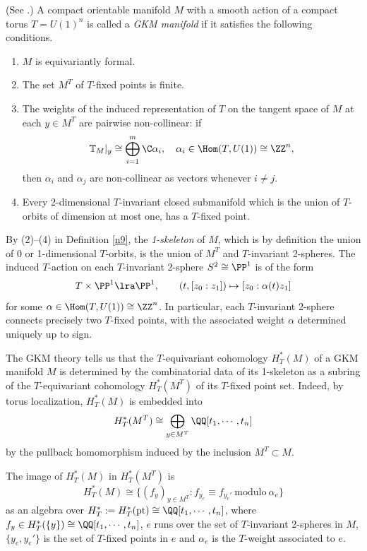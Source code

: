\begin{definition}\label{n9}
(See \cite[Definition 5.1]{AB}.)
A compact orientable manifold $M$ with a smooth action of a compact torus $T=U(1)^n$ is called a \emph{GKM manifold} if it satisfies the following conditions. 
	\begin{enumerate}
		\item $M$ is equivariantly formal.
		\item The set $M^T$ of $T$-fixed points is finite.
		\item The weights of the induced representation of $T$ on the tangent space of $M$ at each $y\in M^T$ are pairwise non-collinear: if
		\[\mathbb{T}_M|_y \cong \bigoplus_{i=1}^m \C \alpha_i, \quad \alpha_i\in \Hom (T,U(1))\cong \ZZ^n, \]
			then $\alpha_i$ and $\alpha_j$ are non-collinear as vectors %
			whenever $i\neq j$.
		\item Every 2-dimensional $T$-invariant closed submanifold which is the union of $T$-orbits of dimension at most one, has a $T$-fixed point. 
	\end{enumerate}
\end{definition}
By (2)--(4) in Definition \ref{n9}, the \emph{1-skeleton} of $M$, which is by definition the union of 0 or 1-dimensional $T$-orbits, is the union of $M^T$ and $T$-invariant 2-spheres. The induced $T$-action on each $T$-invariant 2-sphere $S^2\cong \PP^1$ is of the form
\[T\times \PP^1\lra \PP^1, \qquad (t,[z_0:z_1])\mapsto [z_0:\alpha(t)z_1]\]
for some $\alpha\in \Hom(T,U(1))\cong \ZZ^n$. In particular, each $T$-invariant 2-sphere connects precisely two $T$-fixed points, with the associated weight $\alpha$ determined uniquely up to sign.

The GKM theory \cite{GKM, Kur} tells us that the $T$-equivariant cohomology $H^*_T(M)$ of a GKM manifold $M$ is determined by the combinatorial data of its 1-skeleton as a subring of the $T$-equivariant cohomology $H^*_T(M^T)$ of its 
$T$-fixed point set. 
Indeed, by torus localization, 
$H^*_T(M)$ is embedded into 
\[H^*_T(M^T) 
\cong \bigoplus_{y\in M^T}\QQ[t_1,\cdots, t_n]\] 
by the pullback homomorphism induced by the inclusion $M^T\subset M$.
\begin{theorem} 
\cite[Theorem 5.2]{AB} \label{35} 
The image of $H^*_T(M)$ in $H^*_T(M^T)$ is 
	\[H^*_T(M)\cong \{(f_y)_{y\in M^T}: f_{y_e}\equiv f_{y_e'} \mathrm{~modulo~}\alpha_e\}\]
	as an algebra over $H^*_T:=H^*_T(\mathrm{pt})\cong \QQ[t_1,\cdots,t_n]$, where $f_y\in H^*_T(\{y\})\cong \QQ[t_1,\cdots,t_n]$, $e$ runs over the set of $T$-invariant 2-spheres in $M$, $\{y_e,y_e'\}$ is the set of $T$-fixed points in $e$ and $\alpha_e$ is the $T$-weight associated to $e$.
\end{theorem}



